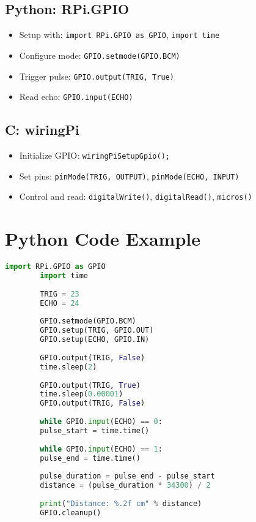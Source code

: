 \documentclass{article}
\begin{document}
	\subsection*{Python: RPi.GPIO}
	\begin{itemize}
		\item Setup with: \texttt{import RPi.GPIO as GPIO}, \texttt{import time}
		\item Configure mode: \texttt{GPIO.setmode(GPIO.BCM)}
		\item Trigger pulse: \texttt{GPIO.output(TRIG, True)}
		\item Read echo: \texttt{GPIO.input(ECHO)}
	\end{itemize}
	
	\subsection*{C: wiringPi}
	\begin{itemize}
		\item Initialize GPIO: \texttt{wiringPiSetupGpio();}
		\item Set pins: \texttt{pinMode(TRIG, OUTPUT)}, \texttt{pinMode(ECHO, INPUT)}
		\item Control and read: \texttt{digitalWrite()}, \texttt{digitalRead()}, \texttt{micros()}
	\end{itemize}
	
	\section{Python Code Example}
	\begin{lstlisting}[language=Python]
		import RPi.GPIO as GPIO
		import time
		
		TRIG = 23
		ECHO = 24
		
		GPIO.setmode(GPIO.BCM)
		GPIO.setup(TRIG, GPIO.OUT)
		GPIO.setup(ECHO, GPIO.IN)
		
		GPIO.output(TRIG, False)
		time.sleep(2)
		
		GPIO.output(TRIG, True)
		time.sleep(0.00001)
		GPIO.output(TRIG, False)
		
		while GPIO.input(ECHO) == 0:
		pulse_start = time.time()
		
		while GPIO.input(ECHO) == 1:
		pulse_end = time.time()
		
		pulse_duration = pulse_end - pulse_start
		distance = (pulse_duration * 34300) / 2
		
		print("Distance: %.2f cm" % distance)
		GPIO.cleanup()
	\end{lstlisting}
	
\end{document}
